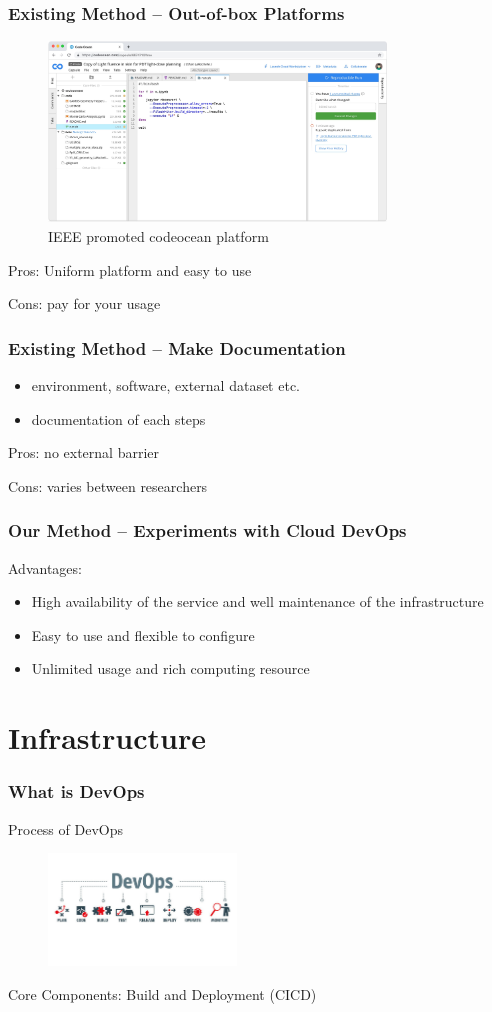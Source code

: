 \documentclass[notheorems]{beamer}
\begin{document}
\begin{frame}
\frametitle{Existing Method -- Out-of-box Platforms}

\begin{figure}
\includegraphics[width=0.8\textwidth]{pic/code_ocean.jpeg}
\caption{IEEE promoted codeocean platform}
\end{figure}
Pros: Uniform platform and easy to use

Cons: pay for your usage
\end{frame}

\begin{frame}
\frametitle{Existing Method -- Make Documentation}

\begin{itemize}
\item environment, software, external dataset etc.
\item documentation of each steps
\end{itemize}

Pros: no external barrier

Cons: varies between researchers
\end{frame}

\begin{frame}
\frametitle{Our Method -- Experiments with Cloud DevOps}
Advantages:
\begin{itemize}
	\item High availability of the service and well maintenance of the infrastructure
	\item Easy to use and flexible to configure
	\item Unlimited usage and rich computing resource
\end{itemize}
\end{frame}
\frame{\tableofcontents[currentsection]}
\section{Infrastructure}
\begin{frame}
\frametitle{What is DevOps}

Process of DevOps
\begin{figure}
\includegraphics[width=5cm]{pic/what-is-devops.jpg}
\end{figure}
Core Components: Build and Deployment (CICD)
\end{frame}
\end{document}
